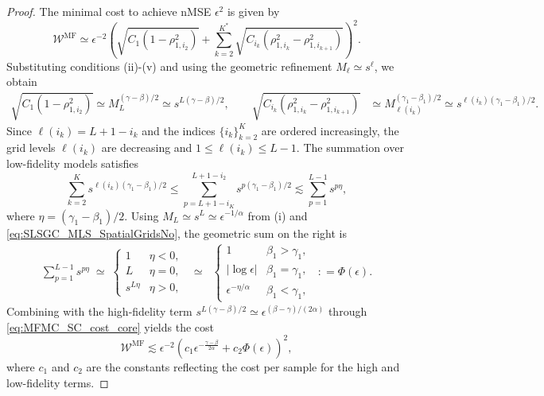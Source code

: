 \begin{proof}
The minimal cost to achieve nMSE $\epsilon^2$ is given by
\begin{equation}\label{eq:MFMC_SC_cost_core}
\mathcal{W}^{\mathrm{MF}} \simeq \epsilon^{-2} \left( \sqrt{C_1 \left(1 - \rho_{1,i_2}^2\right)} + \sum_{k=2}^{K^*} \sqrt{C_{i_k} \left(\rho_{1,i_k}^2 - \rho_{1,i_{k+1}}^2\right)} \right)^2.
\end{equation}
Substituting conditions (ii)-(v) and using the geometric refinement $M_\ell \simeq s^\ell$, we obtain
%
\begin{align*}
\sqrt{C_1 \left(1 - \rho_{1,i_2}^2\right)} \simeq M_L^{(\gamma - \beta)/2} \simeq s^{L(\gamma - \beta)/2}, \qquad \sqrt{C_{i_k} \left(\rho_{1,i_k}^2 - \rho_{1,i_{k+1}}^2\right)} &\simeq M_{\ell(i_k)}^{(\gamma_1 - \beta_1)/2} \simeq s^{\ell(i_k)(\gamma_1 - \beta_1)/2}.
\end{align*}
%
Since $\ell(i_k) = L + 1 - i_k$ and the indices $\{i_k\}_{k=2}^{K}$ are ordered increasingly, the grid levels $\ell(i_k)$ are decreasing and $1\le \ell(i_k)\le L-1$. The summation over low-fidelity models satisfies
%
\[
\sum_{k=2}^{K} s^{\ell(i_k)(\gamma_1 - \beta_1)/2} \leq \sum_{p = L + 1 - i_{K}}^{L+1-i_2} s^{p (\gamma_1 - \beta_1)/2}\lesssim\sum_{p=1}^{L-1} s^{p\eta},
\]
%
where $\eta = (\gamma_1 - \beta_1)/2$. Using $M_L \simeq s^L \simeq \epsilon^{-1/\alpha}$ from (i) and \eqref{eq:SLSGC_MLS_SpatialGridsNo}, the geometric sum on the right is
%
\begin{align*}
\sum_{p=1}^{L-1} s^{p\eta} \;\simeq \;\begin{cases} 
1 & \eta < 0, \\
L & \eta = 0, \\
s^{L\eta} & \eta > 0, 
\end{cases}
\;\;\simeq \;\;
\begin{cases} 
1 & \beta_1 > \gamma_1, \\
|\log \epsilon| & \beta_1 = \gamma_1, \\
\epsilon^{-\eta/\alpha} & \beta_1 < \gamma_1,
\end{cases} \;\;: = \Phi(\epsilon).
\end{align*}
%
Combining with the high-fidelity term $s^{L(\gamma - \beta)/2} \simeq \epsilon^{(\beta - \gamma)/(2\alpha)}$ through \eqref{eq:MFMC_SC_cost_core} yields the cost
%
\[
\mathcal{W}^{\mathrm{MF}} \lesssim \epsilon^{-2} \left( c_1 \epsilon^{-\frac{\gamma-\beta}{2\alpha}} + c_2 \Phi(\epsilon) \right)^2,
\]
where $c_1$ and $c_2$ are the constants reflecting the cost per sample for the high and low-fidelity terms. 

\end{proof}

